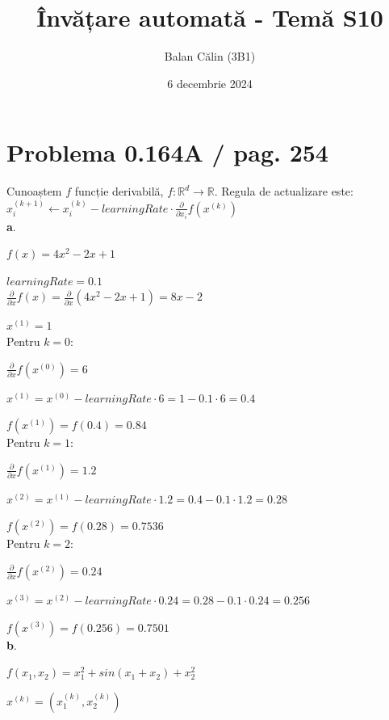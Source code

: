\documentclass{article}
\title{Învățare automată - Temă S10}
\author{Balan Călin (3B1)}
\date{6 decembrie 2024}
\begin{document}
\maketitle

\section*{Problema 0.164A / pag. 254}

Cunoaștem \( f \) funcție derivabilă, \( f : \mathbb{R}^d \to \mathbb{R} \). \newline
Regula de actualizare este: \( x_i^{(k+1)} \leftarrow x_i^{(k)} - learningRate \cdot \frac{\partial}{\partial x_i} f(x^{(k)}) \) \\

\noindent \textbf{a}.

\( f(x) = 4x^2 - 2x + 1 \)

\( learningRate = 0.1 \) \\

\(\frac{\partial}{\partial x}f(x) = \frac{\partial}{\partial x}(4x^2-2x+1) = 8x-2\)

\( x^{(1)} = 1 \) \\

Pentru \( k = 0 \):

\( \frac{\partial}{\partial x} f(x^{(0)}) = 6 \)

\( x^{(1)} = x^{(0)} - learningRate \cdot 6 = 1 - 0.1 \cdot 6 = 0.4 \)

\( f(x^{(1)}) = f(0.4) = 0.84 \) \\

Pentru \( k = 1 \):

\( \frac{\partial}{\partial x} f(x^{(1)}) = 1.2 \)

\( x^{(2)} = x^{(1)} - learningRate \cdot 1.2 = 0.4 - 0.1 \cdot 1.2 = 0.28 \)

\( f(x^{(2)}) = f(0.28) = 0.7536 \) \\

Pentru \( k = 2 \):

\( \frac{\partial}{\partial x} f(x^{(2)}) = 0.24 \)

\( x^{(3)} = x^{(2)} - learningRate \cdot 0.24 = 0.28 - 0.1 \cdot 0.24 = 0.256 \)

\( f(x^{(3)}) = f(0.256) = 0.7501 \) \\

\noindent \textbf{b}.

\( f(x_1, x_2) = x_1^2 + sin(x_1 + x_2) + x_2^2 \)

\( x^{(k)} = (x_1^{(k)}, x_2^{(k)}) \) \\
\end{document}
